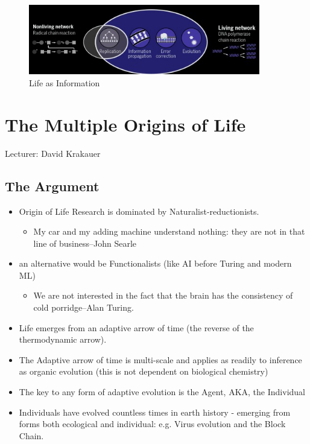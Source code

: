 \documentclass[]{article}
\begin{document}
\begin{figure}[H]
	\caption{Life as Information}\label{fig:LifeInformation}
	\includegraphics[width=0.9\textwidth]{LifeInformation}
\end{figure}


\section{The Multiple Origins of Life}

Lecturer: David Krakauer

\subsection{The Argument}

\begin{itemize}
	\item Origin of Life Research is dominated by Naturalist-reductionists.
	\begin{itemize}
		\item My car and my adding machine 	understand nothing: they are
		not in that line of business--John Searle
	\end{itemize}
	\item an alternative would be Functionalists (like AI before Turing and modern ML)
	\begin{itemize}
		\item We are not interested in the fact that the brain has the consistency of cold porridge--Alan Turing.
	\end{itemize}
	\item Life emerges from an adaptive arrow of time (the reverse of the thermodynamic arrow).
	\item The Adaptive arrow of time is multi-scale and applies as readily to inference as organic evolution (this is not dependent on biological chemistry)
	\item The key to any form of adaptive evolution is the Agent, AKA, the Individual
	\item Individuals have evolved countless times in earth history - emerging from
	forms both ecological and individual: e.g. Virus evolution and the Block Chain.
\end{itemize}
\end{document}
